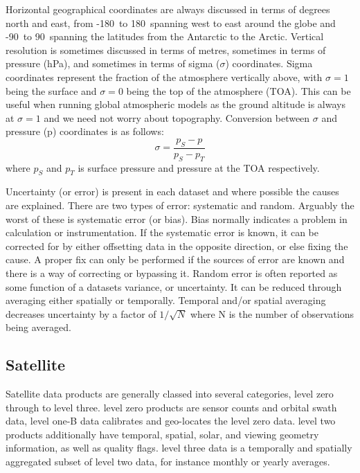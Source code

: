   Horizontal geographical coordinates are always discussed in terms of degrees north and east, from -180\degr ~to 180\degr ~spanning west to east around the globe and -90\degr ~to 90\degr ~spanning the latitudes from the Antarctic to the Arctic.
  Vertical resolution is sometimes discussed in terms of metres, sometimes in terms of pressure (hPa), and sometimes in terms of sigma ($\sigma$) coordinates.
  Sigma coordinates represent the fraction of the atmosphere vertically above, with $\sigma = 1$ being the surface and $\sigma = 0$ being the top of the atmosphere (TOA).
  This can be useful when running global atmospheric models as the ground altitude is always at $\sigma=1$ and we need not worry about topography.
  Conversion between $\sigma$ and pressure (p) coordinates is as follows:
  \begin{equation}
    \label{Model:datasets:eqn_sigma_pressure}
    \sigma = \frac{p_{S} - p}{p_{S}-p_{T}}
  \end{equation}
  where $p_{S}$ and $p_{T}$ is surface pressure and pressure at the TOA respectively.
  
  Uncertainty (or error) is present in each dataset and where possible the causes are explained.
  There are two types of error: systematic and random.
  Arguably the worst of these is systematic error (or bias).
  Bias normally indicates a problem in calculation or instrumentation.
  If the systematic error is known, it can be corrected for by either offsetting data in the opposite direction, or else fixing the cause.
  A proper fix can only be performed if the sources of error are known and there is a way of correcting or bypassing it.
  Random error is often reported as some function of a datasets variance, or uncertainty.
  It can be reduced through averaging either spatially or temporally. 
  Temporal and/or spatial averaging decreases uncertainty by a factor of $1/\sqrt{N}$ where N is the number of observations being averaged.
  
  \subsection{Satellite}
  \label{Model:datasets:satellite}
    Satellite data products are generally classed into several categories, level zero through to level three. level zero products are sensor counts and orbital swath data, level one-B data calibrates and geo-locates the level zero data. 
    level two products additionally have temporal, spatial, solar, and viewing geometry information, as well as quality flags.
    level three data is a temporally and spatially aggregated subset of level two data, for instance monthly or yearly averages.
    
